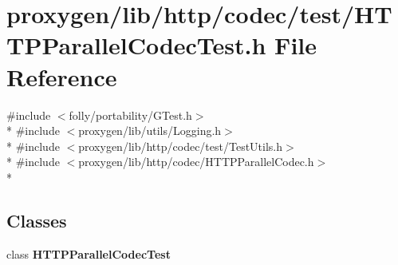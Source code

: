 \section{proxygen/lib/http/codec/test/\+H\+T\+T\+P\+Parallel\+Codec\+Test.h File Reference}
\label{HTTPParallelCodecTest_8h}
{\ttfamily \#include $<$folly/portability/\+G\+Test.\+h$>$}\\*
{\ttfamily \#include $<$proxygen/lib/utils/\+Logging.\+h$>$}\\*
{\ttfamily \#include $<$proxygen/lib/http/codec/test/\+Test\+Utils.\+h$>$}\\*
{\ttfamily \#include $<$proxygen/lib/http/codec/\+H\+T\+T\+P\+Parallel\+Codec.\+h$>$}\\*
\subsection*{Classes}
\begin{DoxyCompactItemize}
\item 
class {\bf H\+T\+T\+P\+Parallel\+Codec\+Test}
\end{DoxyCompactItemize}
